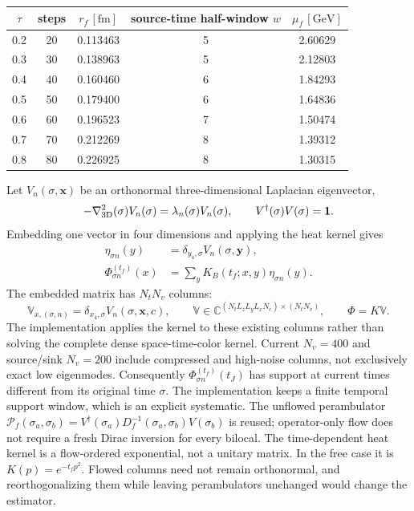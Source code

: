 \documentclass[11pt]{article}
\numberwithin{equation}{section}
\begin{document}
\begin{center}
\begin{tabular}{@{}ccccc@{}}
\toprule
\(\tau\) & steps & \(r_f\,[\mathrm{fm}]\) & source-time half-window \(w\)
 & \(\mu_f\,[\mathrm{GeV}]\)\\
\midrule
0.2 & 20 & 0.113463 & 5 & 2.60629\\
0.3 & 30 & 0.138963 & 5 & 2.12803\\
0.4 & 40 & 0.160460 & 6 & 1.84293\\
0.5 & 50 & 0.179400 & 6 & 1.64836\\
0.6 & 60 & 0.196523 & 7 & 1.50474\\
0.7 & 70 & 0.212269 & 8 & 1.39312\\
0.8 & 80 & 0.226925 & 8 & 1.30315\\
\bottomrule
\end{tabular}
\end{center}

Let \(V_n(\sigma,\boldsymbol{x})\) be an orthonormal three-dimensional
Laplacian eigenvector,
\begin{equation}
 -\nabla^2_{\rm 3D}(\sigma)V_n(\sigma)
   =\lambda_n(\sigma)V_n(\sigma),\qquad
 V^\dagger(\sigma)V(\sigma)=\mathbf 1.
\end{equation}
Embedding one vector in four dimensions and applying the heat kernel gives
\begin{align}
 \eta_{\sigma n}(y)
 &=\delta_{y_4,\sigma}V_n(\sigma,\boldsymbol{y}),\\
 \Phi^{(t_f)}_{\sigma n}(x)
 &=\sum_yK_B(t_f;x,y)\eta_{\sigma n}(y).
\label{eq:l32x64-flowed-basis}
\end{align}
The embedded matrix has \(N_tN_v\) columns:
\begin{equation}
 \mathbb V_{x,(\sigma,n)}
 =\delta_{x_4,\sigma}V_n(\sigma,\boldsymbol{x},c),\qquad
 \mathbb V\in\mathbb C^{(N_tL_zL_yL_xN_c)\times(N_tN_v)},\qquad
 \Phi=K\mathbb V.
\label{eq:l32x64-embedded-dimension}
\end{equation}
The implementation applies the kernel to these existing columns rather
than solving the complete dense space-time-color kernel.  Current
\(N_v=400\) and source/sink \(N_v=200\) include compressed and high-noise
columns, not exclusively exact low eigenmodes.
Consequently \(\Phi_{\sigma n}^{(t_f)}(t_J)\) has support at current times
different from its original time \(\sigma\).  The implementation keeps a
finite temporal support window, which is an explicit systematic.
The unflowed perambulator
\(\mathcal P_f(\sigma_a,\sigma_b)
=V^\dagger(\sigma_a)D_f^{-1}(\sigma_a,\sigma_b)V(\sigma_b)\)
is reused; operator-only flow does not require a fresh Dirac inversion
for every bilocal.  The time-dependent heat kernel is a flow-ordered
exponential, not a unitary matrix.  In the free case it is
\(K(p)=e^{-t_fp^2}\).  Flowed columns need not remain orthonormal, and
reorthogonalizing them while leaving perambulators unchanged would
change the estimator.
\end{document}
